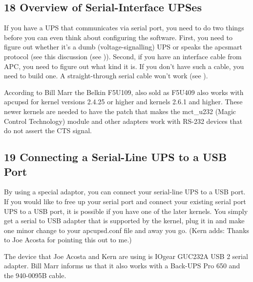 {{{{{{{{{{\subsection*{18 Overview of Serial-Interface UPSes}

\label{index-Serial-UPSes-189}
If you have a UPS that communicates via serial port, you need to do two things
before you can even think about configuring the software. First, you need to
figure out whether it's a dumb (voltage-signalling) UPS or speaks the apcsmart
protocol (see this discussion (see 
)).  Second, if you have an interface
cable from APC, you need to figure out what kind it is.  If you don't have
such a cable, you need to build one.  A straight-through serial cable won't
work (see 
).  

According to Bill Marr the Belkin F5U109, also sold as F5U409 also works with
apcupsd for kernel versions 2.4.25 or higher and kernels 2.6.1 and higher. 
These newer kernels are needed to have the patch that makes the mct\_u232
(Magic Control Technology) module and other adapters work with RS-232 devices
that do not assert the CTS signal. 

\label{Connecting-a-Serial_002dLine-UPS-to-a-USB-Port}

\subsection*{19 Connecting a Serial-Line UPS to a USB Port}

\label{index-Serial-on-USB-190}
By using a special adaptor, you can connect your serial-line UPS to a USB
port. If you would like to free up your serial port and connect your existing
serial port UPS to a USB port, it is possible if you have one of the later
kernels. You simply get a serial to USB adapter that is supported by the
kernel, plug it in and make one minor change to your apcupsd.conf file and
away you go. (Kern adds: Thanks to Joe Acosta for pointing this out to me.)  

The device that Joe Acosta and Kern are using is IOgear GUC232A USB 2 serial
adapter. Bill Marr informs us that it also works with a Back-UPS Pro 650 and
the 940-0095B cable.  

}}}}}}}}}}
